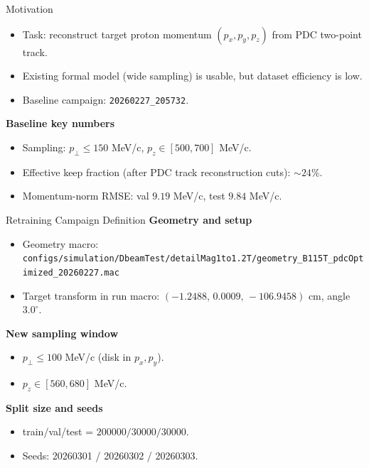 \documentclass[11pt]{beamer}
\begin{document}
\begin{frame}{Motivation}
\begin{itemize}
\item Task: reconstruct target proton momentum \((p_x,p_y,p_z)\) from PDC two-point track.
\item Existing formal model (wide sampling) is usable, but dataset efficiency is low.
\item Baseline campaign: \texttt{20260227\_205732}.
\end{itemize}

\textbf{Baseline key numbers}
\begin{itemize}
\item Sampling: \(p_\perp \le 150\) MeV/c, \(p_z \in [500,700]\) MeV/c.
\item Effective keep fraction (after PDC track reconstruction cuts): \(\sim 24\%\).
\item Momentum-norm RMSE: val \(9.19\) MeV/c, test \(9.84\) MeV/c.
\end{itemize}
\end{frame}

\begin{frame}{Retraining Campaign Definition}
\textbf{Geometry and setup}
\begin{itemize}
\item Geometry macro:
\texttt{configs/simulation/DbeamTest/detailMag1to1.2T/geometry\_B115T\_pdcOptimized\_20260227.mac}
\item Target transform in run macro:
\((-1.2488,\,0.0009,\,-106.9458)\) cm, angle \(3.0^\circ\).
\end{itemize}

\textbf{New sampling window}
\begin{itemize}
\item \(p_\perp \le 100\) MeV/c (disk in \(p_x,p_y\)).
\item \(p_z \in [560,680]\) MeV/c.
\end{itemize}

\textbf{Split size and seeds}
\begin{itemize}
\item train/val/test = \(200000/30000/30000\).
\item Seeds: 20260301 / 20260302 / 20260303.
\end{itemize}
\end{frame}
\end{document}
